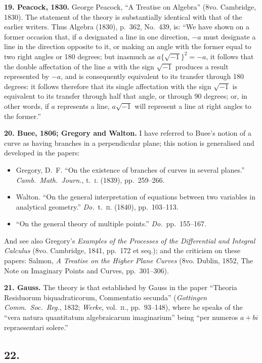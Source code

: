 \documentclass[11pt,a4paper]{book}
\begin{document}
\textbf{19. Peacock, 1830.} George Peacock, ``A Treatise on Algebra'' (8vo. Cambridge, 1830). The statement of the theory is substantially identical with that of the earlier writers. Thus Algebra (1830), p.~362, No.~439, is: ``We have shown on a former occasion that, if $a$ designated a line in one direction, $-a$ must designate a line in the direction opposite to it, or making an angle with the former equal to two right angles or 180 degrees; but inasmuch as $a\{\sqrt{-1}\}^2 = -a$, it follows that the double affectation of the line $a$ with the sign $\sqrt{-1}$ produces a result represented by $-a$, and is consequently equivalent to its transfer through 180 degrees: it follows therefore that its single affectation with the sign $\sqrt{-1}$ is equivalent to its transfer through half that angle, or through 90 degrees; or, in other words, if $a$ represents a line, $a\sqrt{-1}$ will represent a line at right angles to the former.''

\textbf{20. Buee, 1806; Gregory and Walton.} I have referred to Buee's notion of a curve as having branches in a perpendicular plane; this notion is generalised and developed in the papers:
\begin{itemize}
\item Gregory, D.~F. ``On the existence of branches of curves in several planes.'' \textit{Camb.\ Math.\ Journ.}, t.~\textsc{i}. (1839), pp.~259--266.
\item Walton. ``On the general interpretation of equations between two variables in analytical geometry.'' \textit{Do.}\ t.~\textsc{ii}. (1840), pp.~103--113.
\item ``On the general theory of multiple points.'' \textit{Do.}\ pp.~155--167.
\end{itemize}
And see also Gregory's \textit{Examples of the Processes of the Differential and Integral Calculus} (8vo. Cambridge, 1841, pp.~172 et seq.); and the criticism on these papers: Salmon, \textit{A Treatise on the Higher Plane Curves} (8vo. Dublin, 1852, The Note on Imaginary Points and Curves, pp.~301--306).

\textbf{21. Gauss.} The theory is that established by Gauss in the paper ``Theoria Residuorum biquadraticorum, Commentatio secunda'' (\textit{Gottingen Comm.\ Soc.\ Reg.}, 1832; \textit{Werke}, vol.~\textsc{ii}., pp.~93--148), where he speaks of the ``vera natura quantitatum algebraicarum imaginarium'' being ``per numeros $a + bi$ repraesentari solere.''

\subsection*{22.}
\end{document}

